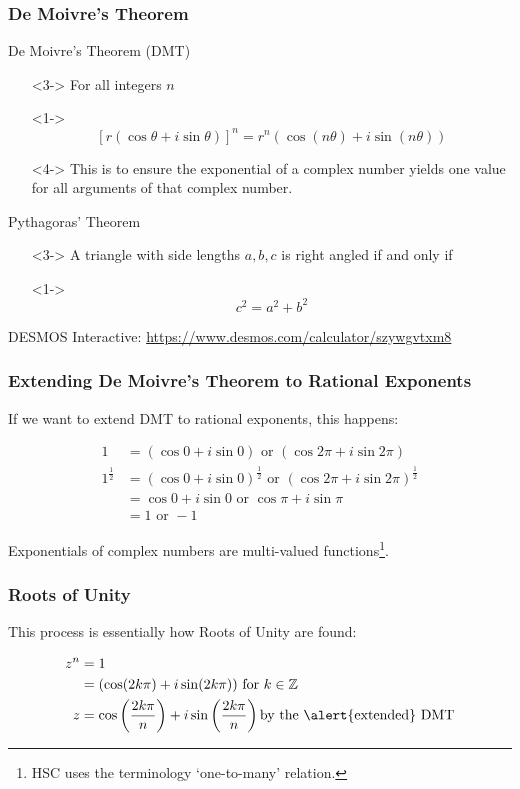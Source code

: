 \documentclass{beamer}
\begin{document}
\begin{frame}
\frametitle{De Moivre's Theorem}
\begin{block}{De Moivre's Theorem (DMT)\parencite{syllabus}}
  \begin{itemize}
    \item[]<3-> For all \alert{integers $n$}
    \item[]<1-> \[[r(\cos\theta + i \sin\theta)]^n = r^n(\cos(n\theta) + i\sin(n\theta))\]
    \item[]<4-> This is to ensure the exponential of a complex number yields one value for all arguments of that complex number.
  \end{itemize}
  \end{block}
  \pause
  \begin{block}{Pythagoras' Theorem}
  \begin{itemize}
    \item[]<3-> A triangle with side lengths $a,b,c$ is right angled if and only if
    \item[]<1-> \[c^2 = a^2 + b^2\]
  \end{itemize}
\end{block}
\pause
DESMOS Interactive: \url{https://www.desmos.com/calculator/szywgvtxm8}
\end{frame}

\begin{frame}
\frametitle{Extending De Moivre's Theorem to Rational Exponents}
If we want to extend DMT to rational exponents, this happens:
\begin{example}
  \begin{align*}
    1 & = (\cos 0 + i \sin 0) \mbox{ or } (\cos 2\pi + i\sin 2 \pi)\\
    1^\frac{1}{2} & = (\cos 0 + i \sin 0)^\frac{1}{2} \mbox{ or }(\cos 2\pi + i\sin 2 \pi)^\frac{1}{2}\\
                  & = \cos 0 + i \sin 0 \mbox{ or } \cos \pi + i \sin \pi\\
                  & = 1 \mbox{ or } -1
  \end{align*}
\end{example}
\pause
Exponentials of complex numbers are \alert{multi-valued} functions\footnote<2->{HSC uses the terminology `one-to-many' relation.}.
\end{frame}

\begin{frame}
  \frametitle{Roots of Unity}
  This process is essentially how Roots of Unity are found:
  \begin{example}
    \begin{align*}
      z^n & = 1\\
          & = (\cos (2k\pi) + i\sin (2k\pi)) \mbox{ for } k \in \mathbb{Z}\\
      z & = \cos\left(\frac{2k\pi}{n}\right) + i\sin \left(\frac{2k\pi}{n}\right) \mbox{by the \alert{extended} DMT}
    \end{align*}
  \end{example}
\end{frame}
\end{document}
